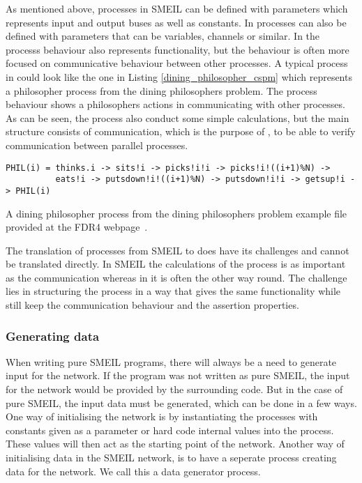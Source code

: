 As mentioned above, processes in SMEIL can be defined with parameters which represents input and output buses as well as constants. In \cspm{} processes can also be defined with parameters that can be variables, channels or similar.
In \cspm the processs behaviour also represents functionality, but the behaviour is often more focused on communicative behaviour between other processes. A typical process in \cspm could look like the one in Listing \ref{dining_philosopher_cspm} which represents a philosopher process from the dining philosophers problem. %
The process behaviour shows a philosophers actions in communicating with other processes. As can be seen, the process also conduct some simple calculations, but the main structure consists of communication, which is the purpose of \cspm, to be able to verify communication between parallel processes.
\begin{listing}
\begin{verbatim}
PHIL(i) = thinks.i -> sits!i -> picks!i!i -> picks!i!((i+1)%N) ->
          eats!i -> putsdown!i!((i+1)%N) -> putsdown!i!i -> getsup!i -> PHIL(i)

\end{verbatim}
\caption{A dining philosopher process from the dining philosophers problem example file provided at the FDR4 webpage~\cite{fdr_example}.}
\label{dining_philosopher_cspm}
\end{listing}

The translation of processes from SMEIL to \cspm does have its challenges and cannot be translated directly. In SMEIL the calculations of the process is as important as the communication whereas in \cspm it is often the other way round. The challenge lies in structuring the \cspm process in a way that gives the same functionality while still keep the \cspm communication behaviour and the assertion properties.

\subsubsection{Generating data}
When writing pure SMEIL programs, there will always be a need to generate input for the network. If the program was not written as pure SMEIL, the input for the network would be provided by the surrounding code. But in the case of pure SMEIL, the input data must be generated, which can be done in a few ways.
One way of initialising the network is by instantiating the processes with constants given as a parameter or hard code internal values into the process. These values will then act as the starting point of the network. Another way of initialising data in the SMEIL network, is to have a seperate process creating data for the network. We call this a data generator process.

